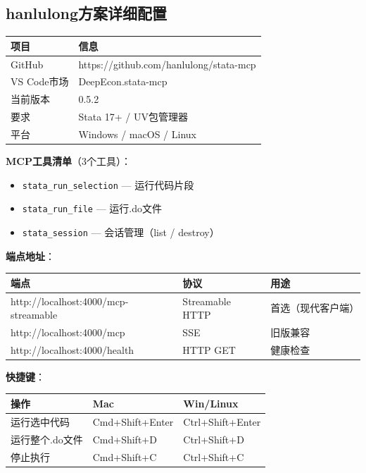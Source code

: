 \subsection{hanlulong方案详细配置}

\begin{table}[H]
\centering
\begin{tabular}{ll}
\toprule
\textbf{项目} & \textbf{信息} \\
\midrule
GitHub & https://github.com/hanlulong/stata-mcp \\
VS Code市场 & DeepEcon.stata-mcp \\
当前版本 & 0.5.2 \\
要求 & Stata 17+ / UV包管理器 \\
平台 & Windows / macOS / Linux \\
\bottomrule
\end{tabular}
\end{table}

\textbf{MCP工具清单}（3个工具）：

\begin{itemize}[leftmargin=2em]
  \item \texttt{stata\_run\_selection} — 运行代码片段
  \item \texttt{stata\_run\_file} — 运行.do文件
  \item \texttt{stata\_session} — 会话管理（list / destroy）
\end{itemize}

\textbf{端点地址}：

\begin{table}[H]
\centering
\begin{tabular}{lll}
\toprule
\textbf{端点} & \textbf{协议} & \textbf{用途} \\
\midrule
http://localhost:4000/mcp-streamable & Streamable HTTP & 首选（现代客户端） \\
http://localhost:4000/mcp & SSE & 旧版兼容 \\
http://localhost:4000/health & HTTP GET & 健康检查 \\
\bottomrule
\end{tabular}
\end{table}

\textbf{快捷键}：

\begin{table}[H]
\centering
\begin{tabular}{lll}
\toprule
\textbf{操作} & \textbf{Mac} & \textbf{Win/Linux} \\
\midrule
运行选中代码 & Cmd+Shift+Enter & Ctrl+Shift+Enter \\
运行整个.do文件 & Cmd+Shift+D & Ctrl+Shift+D \\
停止执行 & Cmd+Shift+C & Ctrl+Shift+C \\
\bottomrule
\end{tabular}
\end{table}

